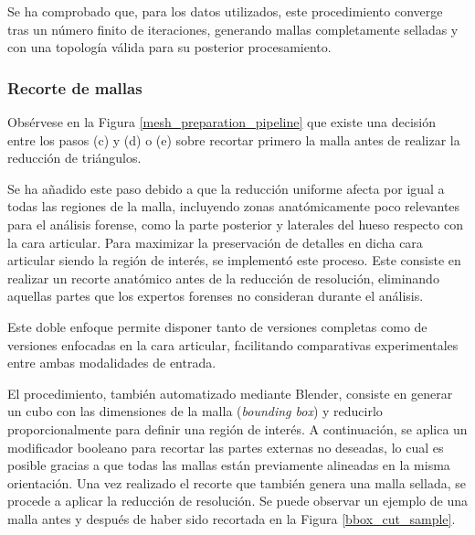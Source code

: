 Se ha comprobado que, para los datos utilizados, este procedimiento converge tras un número finito de iteraciones, generando mallas completamente selladas y con una topología válida para su posterior procesamiento.

\subsubsection{Recorte de mallas}
Obsérvese en la Figura \ref{mesh_preparation_pipeline} que existe una decisión entre los pasos (c) y (d) o (e) sobre recortar primero la malla antes de realizar la reducción de triángulos.

Se ha añadido este paso debido a que la reducción uniforme afecta por igual a todas las regiones de la malla, incluyendo zonas anatómicamente poco relevantes para el análisis forense, como la parte posterior y laterales del hueso respecto con la cara articular. Para maximizar la preservación de detalles en dicha cara articular siendo la región de interés, se implementó este proceso. Este consiste en realizar un recorte anatómico antes de la reducción de resolución, eliminando aquellas partes que los expertos forenses no consideran durante el análisis.

Este doble enfoque permite disponer tanto de versiones completas como de versiones enfocadas en la cara articular, facilitando comparativas experimentales entre ambas modalidades de entrada.

El procedimiento, también automatizado mediante Blender, consiste en generar un cubo con las dimensiones de la malla (\textit{bounding box}) y reducirlo proporcionalmente para definir una región de interés. A continuación, se aplica un modificador booleano para recortar las partes externas no deseadas, lo cual es posible gracias a que todas las mallas están previamente alineadas en la misma orientación. Una vez realizado el recorte que también genera una malla sellada, se procede a aplicar la reducción de resolución. Se puede observar un ejemplo de una malla antes y después de haber sido recortada en la Figura \ref{bbox_cut_sample}.

